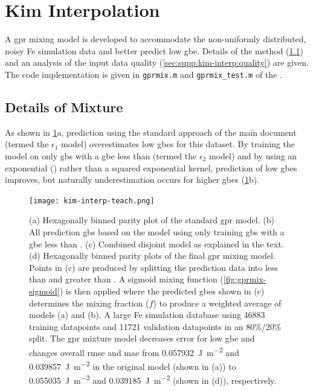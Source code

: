 \documentclass[preprint,12pt]{elsarticle}
\begin{document}


\section{Kim Interpolation}
\label{sec:supp:kim-interp}

A \gls{gpr} mixing model is developed to accommodate the non-uniformly distributed, noisy Fe simulation data \cite{kimPhasefieldModeling3D2014} and better predict low \gls{gbe}. Details of the method (\cref{sec:supp:kim-interp:method}) and an analysis of the input data quality (\cref{sec:supp:kim-interp:quality}) are given. The code implementation is given in \texttt{gprmix.m} and \texttt{gprmix\_test.m} of the \vfzorepo{} \cite{bairdFiveDegreeofFreedom5DOF2020}.

\subsection{Details of  Mixture}
\label{sec:supp:kim-interp:method}
As shown in \cref{fig:kim-interp-teach}a, prediction using the standard approach of the main document (termed the $\epsilon_1$ model) overestimates low \glspl{gbe} for this dataset. By training the model on only \glspl{gb} with a \gls{gbe} less than \thrtwo{} (termed the $\epsilon_2$ model) and by using an exponential () rather than a squared exponential kernel, prediction of low \glspl{gbe} improves, but naturally underestimation occurs for higher \glspl{gbe} (\cref{fig:kim-interp-teach}b).

\begin{figure}
    \centering
    \texttt{[image: kim-interp-teach.png]}
    \caption{(a) Hexagonally binned parity plot of the standard \gls{gpr} model. (b) All prediction \glspl{gb} based on the model using only training \glspl{gb} with a \gls{gbe} less than \thrtwo{}. (c) Combined disjoint model as explained in the text. (d) Hexagonally binned parity plots of the final \gls{gpr} mixing model. Points in (c) are produced by splitting the prediction data into less than and greater than \thr{}. A sigmoid mixing function (\cref{fig:gprmix-sigmoid}) is then applied where the predicted \glspl{gbe} shown in (c) determines the mixing fraction ($f$) to produce a weighted average of models (a) and (b). A large Fe simulation database \cite{kimPhasefieldModeling3D2014} using \num{46883} training datapoints and \num{11721} validation datapoints in an 80\%/20\% split. The \gls{gpr} mixture model decreases error for low \gls{gbe} and changes overall \gls{rmse} and \gls{mae} from \SI{0.057932}{\J\per\square\meter} and \SI{0.039857}{\J\per\square\meter} in the original model (shown in (a)) to \SI{0.055035}{\J\per\square\meter} and \SI{0.039185}{\J\per\square\meter} (shown in (d)), respectively.}
    \label{fig:kim-interp-teach}
\end{figure}
\end{document}

